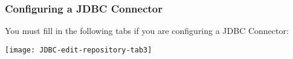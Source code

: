 %
%

\subsubsection{Configuring a JDBC Connector}

You must fill in the following tabs if you are configuring a JDBC
Connector:

\texttt{[image: JDBC-edit-repository-tab3]}

